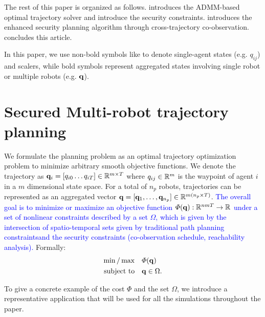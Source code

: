 \documentclass[10pt,twocolumn,twoside]{IEEEtran}
\newcommand{\new}[1]{\textcolor{blue}{#1}}
\newcommand{\news}{\color{blue}}
\begin{document}
The rest of this paper is organized as follows.  introduces the ADMM-based optimal trajectory solver and introduce the security constraints.  introduces the enhanced security planning algorithm through cross-trajectory co-observation.  concludes this article.

\noindent{} 
In this paper, we use non-bold symbols like to denote single-agent states (e.g. $q_{ij}$) and scalers, while bold symbols represent aggregated states involving single robot or multiple robots (e.g. $\mathbf{q}$). 

\section{Secured Multi-robot trajectory planning}\label{sec:ADMM-planning}
We formulate the planning problem as an optimal trajectory optimization problem to minimize arbitrary smooth objective functions. {\news {}We denote the trajectory as $\mathbf{q}_i = [q_{i0}\dots q_{iT}]\in\mathbb{R}^{m\times T}{}$ where $q_{ij}\in\mathbb{R}^{m}{}$ is the waypoint of agent $i$ in a $m$ dimensional state space. For a total of $n_p$ robots, trajectories can be represented as an aggregated vector $\mathbf{q} = [\mathbf{q}_1,\dots,\mathbf{q}_{n_p}]\in \mathbb{R}^{m (n_p\times T)}{}$. }
\new{The overall goal is to minimize or maximize an objective function $\varPhi(\mathbf{q}):\mathbb{R}^{n m T}{} \to \mathbb{R}^{}{}$ under a set of nonlinear constraints described by a set $\Omega$, which is given by the intersection of spatio-temporal sets given by traditional path planning constraintsand the security constraints (co-observation schedule, reachability analysis).} Formally:
\begin{equation}\label{eq:general-problem}
	\begin{split}
		\min/\max & \quad \varPhi(\mathbf{q})\\
		\textrm{subject to} &\quad \mathbf{q} \in \Omega.
	\end{split}
\end{equation}

To give a concrete example of the cost $\varPhi$ and the set $\Omega$, we introduce a representative application that will be used for all the simulations throughout the paper.
\end{document}
